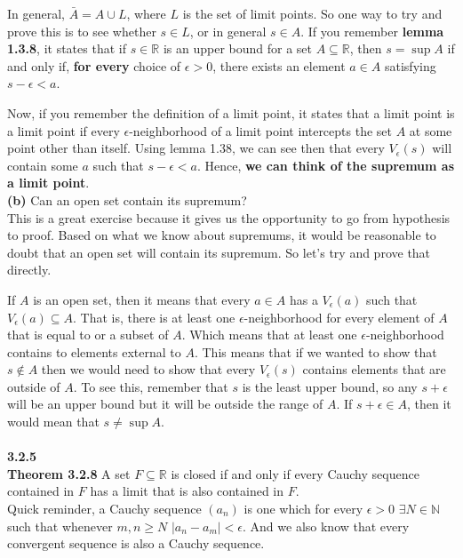 In general, $\bar{A} = A \cup L$, where $L$ is the set of limit points.
So one way to try and prove this is to see whether $s \in L$, or in general $s \in A$.
If you remember \textbf{lemma 1.3.8},
it states that if $s \in \mathbb{R}$ is an upper bound for a set $A \subseteq \mathbb{R}$,
then $s = \sup A$ if and only if, \textbf{for every} choice of $\epsilon > 0$,
there exists an element $a \in A$ satisfying $s - \epsilon < a$.

Now, if you remember the definition of a limit point, it states that a limit point is a limit point
if every $\epsilon$-neighborhood of a limit point intercepts the set $A$ at some point other than itself.
Using lemma 1.38, we can see then that every $V_\epsilon (s)$ will contain some $a$ such that $s - \epsilon < a$.
Hence, \textbf{we can think of the supremum as a limit point}.
\\

\textbf{(b)} Can an open set contain its supremum?
\\

This is a great exercise because it gives us the opportunity to go from hypothesis to proof.
Based on what we know about supremums, it would be reasonable to doubt that an open set will contain its supremum.
So let's try and prove that directly.

If $A$ is an open set, then it means that every $a \in A$ has a $V_\epsilon (a)$ such that $V_{\epsilon} (a) \subseteq A$.
That is, there is at least one $\epsilon$-neighborhood for every element of $A$ that is equal to or a subset of $A$.
Which means that at least one $\epsilon$-neighborhood contains to elements external to $A$.
This means that if we wanted to show that $s \not\in A$ then we would need to show that every $V_\epsilon (s)$
contains elements that are outside of $A$.
To see this, remember that $s$ is the least upper bound, so any $s+\epsilon$ will be an upper bound but it will be
outside the range of $A$.
If $s+\epsilon \in A$, then it would mean that $s \neq \sup A$.
\\~\\




\textbf{3.2.5}
\\

\textbf{Theorem 3.2.8} A set $F \subseteq \mathbb{R}$ is closed if and only if every
Cauchy sequence contained in $F$ has a limit that is also contained in $F$.
\\

Quick reminder, a Cauchy sequence $(a_n)$ is one which for every $\epsilon >0$
$\exists N\in\mathbb{N}$ such that whenever $m,n \geq N$ $|a_n - a_m| < \epsilon$.
And we also know that every convergent sequence is also a Cauchy sequence.
\\

